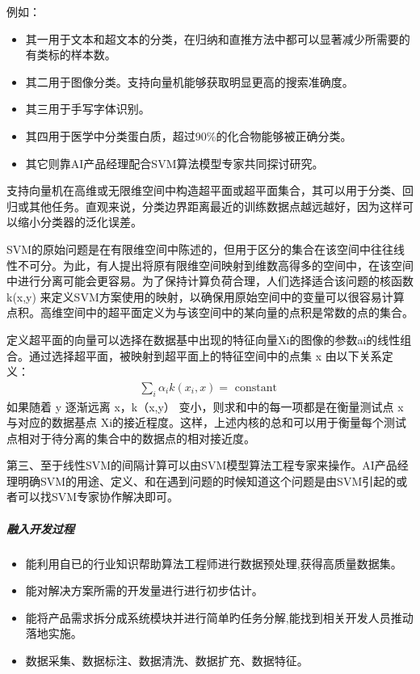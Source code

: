 \documentclass[letterpaper,11pt,english]{sphinxmanual}
\begin{document}
例如：
\begin{itemize}
\item {} 
其一用于文本和超文本的分类，在归纳和直推方法中都可以显著减少所需要的有类标的样本数。

\item {} 
其二用于图像分类。支持向量机能够获取明显更高的搜索准确度。

\item {} 
其三用于手写字体识别。

\item {} 
其四用于医学中分类蛋白质，超过90\%的化合物能够被正确分类。

\item {} 
其它则靠AI产品经理配合SVM算法模型专家共同探讨研究。

\end{itemize}


支持向量机在高维或无限维空间中构造超平面或超平面集合，其可以用于分类、回归或其他任务。直观来说，分类边界距离最近的训练数据点越远越好，因为这样可以缩小分类器的泛化误差。

SVM的原始问题是在有限维空间中陈述的，但用于区分的集合在该空间中往往线性不可分。为此，有人提出将原有限维空间映射到维数高得多的空间中，在该空间中进行分离可能会更容易。为了保持计算负荷合理，人们选择适合该问题的核函数
k(x,y)
来定义SVM方案使用的映射，以确保用原始空间中的变量可以很容易计算点积。高维空间中的超平面定义为与该空间中的某向量的点积是常数的点的集合。

定义超平面的向量可以选择在数据基中出现的特征向量Xi的图像的参数ai的线性组合。通过选择超平面，被映射到超平面上的特征空间中的点集
x 由以下关系定义：
\begin{equation}\label{equation:chapter_idea/understand_tech:chapter_idea/understand_tech:0}
\begin{split}\sum_{i} \alpha_{i} k\left(x_{i}, x\right)=\text { constant }\end{split}
\end{equation}
如果随着 y 逐渐远离 x，k（x,y） 变小，则求和中的每一项都是在衡量测试点 x
与对应的数据基点
Xi的接近程度。这样，上述内核的总和可以用于衡量每个测试点相对于待分离的集合中的数据点的相对接近度。

第三、至于线性SVM的间隔计算可以由SVM模型算法工程专家来操作。AI产品经理明确SVM的用途、定义、和在遇到问题的时候知道这个问题是由SVM引起的或者可以找SVM专家协作解决即可。


\subparagraph{融入开发过程}
\label{\detokenize{chapter_idea/understand_tech:id6}}\begin{itemize}
\item {} 
能利用自已的行业知识帮助算法工程师进行数据预处理,获得高质量数据集。

\item {} 
能对解决方案所需的开发量进行进行初步估计。

\item {} 
能将产品需求拆分成系统模块并进行简单旳任务分解,能找到相关开发人员推动落地实施。

\item {} 
数据采集、数据标注、数据清洗、数据扩充、数据特征。

\end{itemize}
\end{document}
